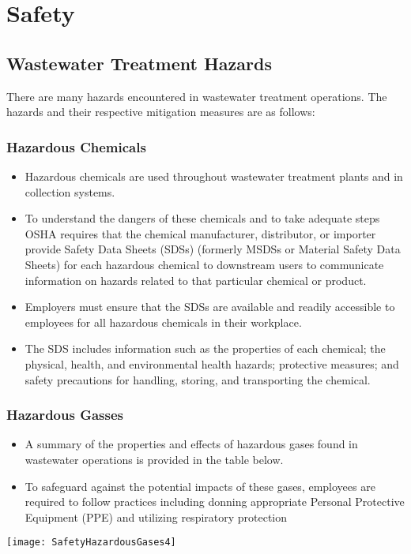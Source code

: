 \chapter{Safety}
\section{Wastewater Treatment Hazards}
There are many hazards encountered in wastewater treatment operations.  The hazards and their respective mitigation measures are as follows:\\
\subsection{Hazardous Chemicals}
\begin{itemize}
\item Hazardous chemicals are used throughout wastewater treatment plants and in collection systems. 
\item To understand the dangers of these chemicals and to take adequate steps OSHA requires that the chemical manufacturer, distributor, or importer provide Safety Data Sheets (SDSs) (formerly MSDSs or Material Safety Data Sheets) for each hazardous chemical to downstream users to communicate information on hazards related to that particular chemical or product.
\item Employers must ensure that the SDSs are available and readily accessible to employees for all hazardous chemicals in their workplace.
\item The SDS includes information such as the properties of each chemical; the physical, health, and environmental health hazards; protective measures; and safety precautions for handling, storing, and transporting the chemical.\\
\end{itemize}
\subsection{Hazardous Gasses}
\begin{itemize}
\item A summary of the properties and effects of hazardous gases found in wastewater operations is provided in the table below.
\item To safeguard against the potential impacts of these gases, employees are required to follow practices including donning appropriate Personal Protective Equipment (PPE) and utilizing respiratory protection\\
\end{itemize}
\begin{center}
\texttt{[image: SafetyHazardousGases4]}\\ 
\end{center}

